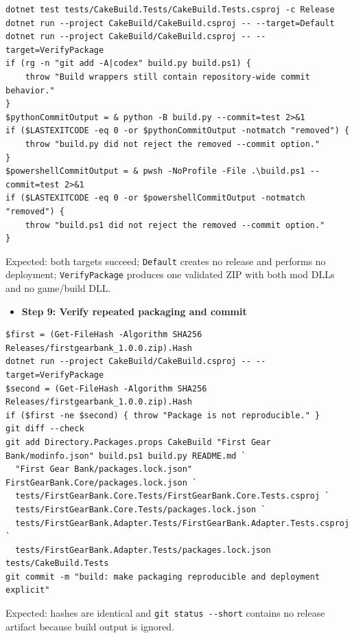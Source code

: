 \documentclass[
  10pt,
  letterpaper,
]{article}
\newcommand{\passthrough}[1]{#1}
\providecommand{\tightlist}{%
  \setlength{\itemsep}{0pt}\setlength{\parskip}{0pt}}
\begin{document}
\begin{lstlisting}
dotnet test tests/CakeBuild.Tests/CakeBuild.Tests.csproj -c Release
dotnet run --project CakeBuild/CakeBuild.csproj -- --target=Default
dotnet run --project CakeBuild/CakeBuild.csproj -- --target=VerifyPackage
if (rg -n "git add -A|codex" build.py build.ps1) {
    throw "Build wrappers still contain repository-wide commit behavior."
}
$pythonCommitOutput = & python -B build.py --commit=test 2>&1
if ($LASTEXITCODE -eq 0 -or $pythonCommitOutput -notmatch "removed") {
    throw "build.py did not reject the removed --commit option."
}
$powershellCommitOutput = & pwsh -NoProfile -File .\build.ps1 --commit=test 2>&1
if ($LASTEXITCODE -eq 0 -or $powershellCommitOutput -notmatch "removed") {
    throw "build.ps1 did not reject the removed --commit option."
}
\end{lstlisting}

Expected: both targets succeed; \passthrough{\lstinline!Default!}
creates no release and performs no deployment;
\passthrough{\lstinline!VerifyPackage!} produces one validated ZIP with
both mod DLLs and no game/build DLL.

\begin{itemize}
\tightlist
\item[$\square$]
  \textbf{Step 9: Verify repeated packaging and commit}
\end{itemize}

\begin{lstlisting}
$first = (Get-FileHash -Algorithm SHA256 Releases/firstgearbank_1.0.0.zip).Hash
dotnet run --project CakeBuild/CakeBuild.csproj -- --target=VerifyPackage
$second = (Get-FileHash -Algorithm SHA256 Releases/firstgearbank_1.0.0.zip).Hash
if ($first -ne $second) { throw "Package is not reproducible." }
git diff --check
git add Directory.Packages.props CakeBuild "First Gear Bank/modinfo.json" build.ps1 build.py README.md `
  "First Gear Bank/packages.lock.json" FirstGearBank.Core/packages.lock.json `
  tests/FirstGearBank.Core.Tests/FirstGearBank.Core.Tests.csproj `
  tests/FirstGearBank.Core.Tests/packages.lock.json `
  tests/FirstGearBank.Adapter.Tests/FirstGearBank.Adapter.Tests.csproj `
  tests/FirstGearBank.Adapter.Tests/packages.lock.json tests/CakeBuild.Tests
git commit -m "build: make packaging reproducible and deployment explicit"
\end{lstlisting}

Expected: hashes are identical and
\passthrough{\lstinline!git status --short!} contains no release
artifact because build output is ignored.
\end{document}
